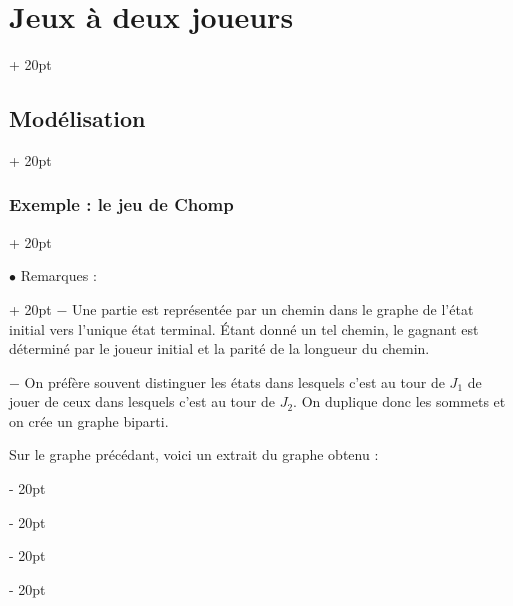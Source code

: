 \documentclass[a4paper, 12pt, twoside]{article}
\newcommand{\ind}[1][20pt]{\advance\leftskip + #1}
\newcommand{\deind}[1][20pt]{\advance\leftskip - #1}
\newenvironment{indt}[2][20pt]{#2 \par \ind[#1]}{\par \deind} %
\begin{document}
\begin{indt}{\section{Jeux à deux joueurs}}
\begin{indt}{\subsection{Modélisation}}
\begin{indt}{\subsubsection{Exemple : le jeu de Chomp}}
\begin{center}
                \end{center}

                \begin{indt}{$\bullet$ Remarques :}
                    $-$ Une partie est représentée par un chemin dans le graphe de l'état initial vers l'unique état terminal.
                    \'Etant donné un tel chemin, le gagnant est déterminé par le joueur initial et la parité de la longueur du chemin.

                    $-$ On préfère souvent distinguer les états dans lesquels c'est au tour de $J_1$ de jouer de ceux dans lesquels c'est au tour de $J_2$.
                    On duplique donc les sommets et on crée un graphe biparti.

                    Sur le graphe précédant, voici un extrait du graphe obtenu :

                    \begin{center}
\end{center}
\end{indt}
\end{indt}
\end{indt}
\end{indt}
\end{document}
